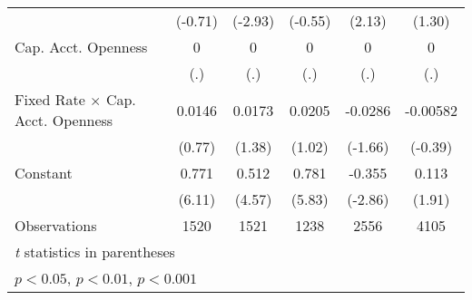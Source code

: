 \begin{table}[htbp]
\begin{tabular}{l*{5}{c}}
                                        &  (-0.71)         &  (-2.93)         &  (-0.55)         &   (2.13)         &   (1.30)         \\
\addlinespace
Cap. Acct. Openness                     &        0         &        0         &        0         &        0         &        0         \\
                                        &      (.)         &      (.)         &      (.)         &      (.)         &      (.)         \\
\addlinespace
Fixed Rate $\times$ Cap. Acct. Openness &   0.0146         &   0.0173         &   0.0205         &  -0.0286         & -0.00582         \\
                                        &   (0.77)         &   (1.38)         &   (1.02)         &  (-1.66)         &  (-0.39)         \\
\addlinespace
Constant                                &    0.771\sym{***}&    0.512\sym{***}&    0.781\sym{***}&   -0.355\sym{**} &    0.113         \\
                                        &   (6.11)         &   (4.57)         &   (5.83)         &  (-2.86)         &   (1.91)         \\
\midrule
Observations                            &     1520         &     1521         &     1238         &     2556         &     4105         \\
\bottomrule
\multicolumn{6}{l}{\footnotesize \textit{t} statistics in parentheses}\\
\multicolumn{6}{l}{\footnotesize \sym{*} \(p<0.05\), \sym{**} \(p<0.01\), \sym{***} \(p<0.001\)}\\
\end{tabular}
\end{table}

